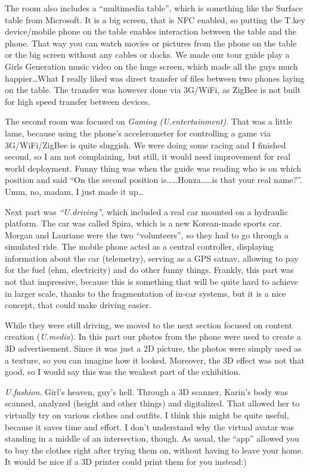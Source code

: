 \begin{post}
\begin{content}
The room also includes a ``multimedia table'', which is something like the Surface table from Microsoft. It is a big screen, that is NFC enabled, so putting the T.key device/mobile phone on the table enables interaction between the table and the phone. That way you can watch movies or pictures from the phone on the table or the big screen without any cables or docks. We made our tour guide play a Girls Generation music video on the huge screen, which made all the guys much happier{\ldots}What I really liked was direct transfer of files between two phones laying on the table. The transfer was however done via 3G/WiFi, as ZigBee is not built for high speed transfer between devices.

The second room was focused on \textit{Gaming (U.entertainment)}. That was a little lame, because using the phone's accelerometer for controlling a game via 3G/WiFi/ZigBee is quite sluggish. We were doing some racing and I finished second, so I am not complaining, but still, it would need improvement for real world deployment. Funny thing was when the guide was reading who is on which position and said ``On the second position is{\ldots}{\ldots}Honza{\ldots}{\ldots}is that your real name?''. Umm, no, madam, I just made it up\ldots

Next part was \textit{``U.driving''}, which included a real car mounted on a hydraulic platform. The car was called Spira, which is a new Korean-made sports car. Morgan and Lauriane were the two ``volunteers'', so they had to go through a simulated ride. The mobile phone acted as a central controller, displaying information about the car (telemetry), serving as a GPS satnav, allowing to pay for the fuel (ehm, electricity) and do other funny things. Frankly, this part was not that impressive, because this is something that will be quite hard to achieve in larger scale, thanks to the fragmentation of in-car systems, but it is a nice concept, that could make driving easier.

While they were still driving, we moved to the next section focused on content creation (\textit{U.media}). In this part our photos from the phone were used to create a 3D advertisement. Since it was just a 2D picture, the photos were simply used as a texture, so you can imagine how it looked. Moreover, the 3D effect was not that good, so I would say this was the weakest part of the exhibition.

\textit{U.fashion}. Girl's heaven, guy's hell. Through a 3D scanner, Karin's body was scanned, analyzed (height and other things) and digitalized. That allowed her to virtually try on various clothes and outfits. I think this might be quite useful, because it saves time and effort. I don't understand why the virtual avatar was standing in a middle of an intersection, though. As usual, the ``app'' allowed you to buy the clothes right after trying them on, without having to leave your home. It would be nice if a 3D printer could print them for you instead:)


\end{content}
\end{post}
